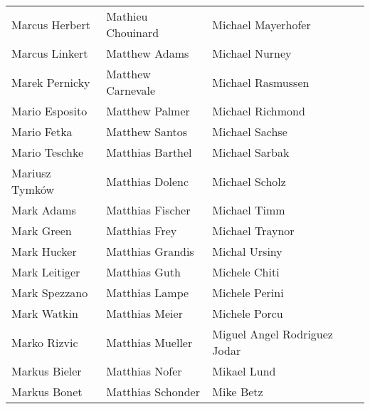 \begin{tabular}{p{4.5cm}p{4.5cm}p{4.5cm}}
Marcus Herbert & Mathieu Chouinard & Michael Mayerhofer \\
Marcus Linkert & Matthew Adams & Michael Nurney \\
Marek Pernicky & Matthew Carnevale & Michael Rasmussen \\
Mario Esposito & Matthew Palmer & Michael Richmond \\
Mario Fetka & Matthew Santos & Michael Sachse \\
Mario Teschke & Matthias Barthel & Michael Sarbak \\
Mariusz Tymków & Matthias Dolenc & Michael Scholz \\
Mark Adams & Matthias Fischer & Michael Timm \\
Mark Green & Matthias Frey & Michael Traynor \\
Mark Hucker & Matthias Grandis & Michal Ursiny \\
Mark Leitiger & Matthias Guth & Michele Chiti \\
Mark Spezzano & Matthias Lampe & Michele Perini \\
Mark Watkin & Matthias Meier & Michele Porcu \\
Marko Rizvic & Matthias Mueller & Miguel Angel Rodriguez Jodar \\
Markus Bieler & Matthias Nofer & Mikael Lund \\
Markus Bonet & Matthias Schonder & Mike Betz \\
\end{tabular}
\newpage
\setlength{\tabcolsep}{1mm}
